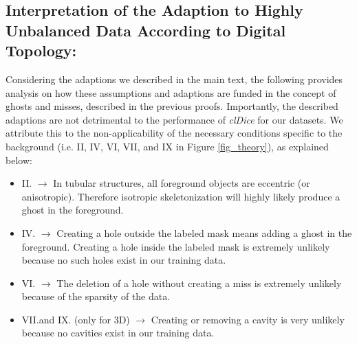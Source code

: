 

\subsection{Interpretation of the Adaption to Highly Unbalanced Data According to Digital Topology:}
Considering the adaptions we described in the main text, the following provides analysis on how these assumptions and adaptions are funded in the concept of ghosts and misses, described in the previous proofs. Importantly, the described adaptions are not detrimental to the performance of \textit{clDice} for our datasets.
We attribute this to the non-applicability of the necessary conditions specific to the background (i.e. II, IV, VI, VII, and IX in Figure \ref{fig_theory}), as explained below: 

\begin{itemize}[,itemsep=-2pt]
    \item II. $\rightarrow$ In tubular structures, all foreground objects are eccentric (or anisotropic). Therefore isotropic skeletonization will highly likely produce a ghost in the foreground.
    \item IV. $\rightarrow$ Creating a hole outside the labeled mask means adding a ghost in the foreground. Creating a hole inside the labeled mask is extremely unlikely because no such holes exist in our training data.
    \item VI. $\rightarrow$ The deletion of a hole without creating a miss is extremely unlikely because of the sparsity of the data.
    \item VII.and IX. (only for 3D) $\rightarrow$ Creating or removing a cavity is very unlikely because no cavities exist in our training data.
\end{itemize}

